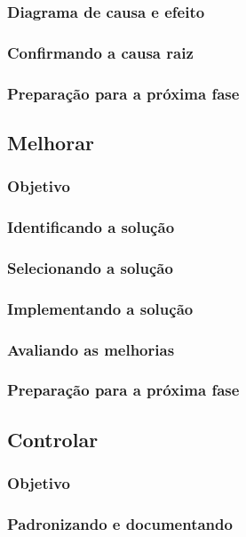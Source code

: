 \documentclass{abnt}
\begin{document}
					\subsubsection {Diagrama de causa e efeito}
					\subsubsection {Confirmando a causa raiz}
					\subsubsection {Preparação para a próxima fase}
				\subsection {Melhorar}
					\subsubsection {Objetivo}
					\subsubsection {Identificando a solução}
					\subsubsection {Selecionando a solução}
					\subsubsection {Implementando a solução}
					\subsubsection {Avaliando as melhorias}
					\subsubsection {Preparação para a próxima fase}
				\subsection {Controlar}
					\subsubsection {Objetivo}
					\subsubsection {Padronizando e documentando}
\end{document}
